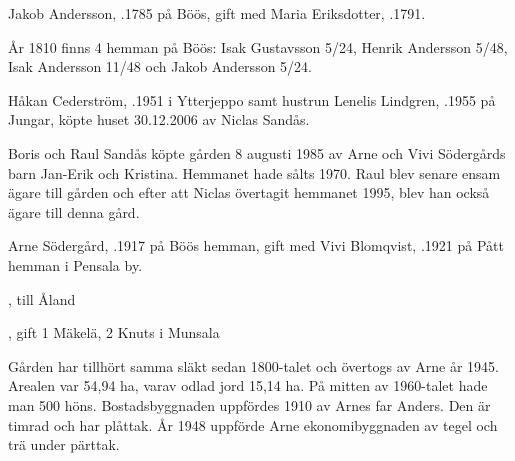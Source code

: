 Jakob Andersson,  .1785 på Böös, gift med Maria Eriksdotter, .1791.
\begin{jhchildren}
  \item {}
  \item {}
  \item {}
  \item {}
  \item {}
  \item {}
\end{jhchildren}
År 1810 finns 4 hemman på Böös: Isak Gustavsson 5/24, Henrik Andersson 5/48, Isak Andersson 11/48 och Jakob Andersson 5/24.




Håkan Cederström,  .1951 i Ytterjeppo samt hustrun Lenelis Lindgren, .1955 på Jungar, köpte huset 30.12.2006
av Niclas Sandås.

Boris och Raul Sandås köpte gården 8 augusti 1985 av Arne och Vivi Södergårds barn Jan-Erik och Kristina. Hemmanet hade sålts 1970. Raul blev senare ensam ägare till gården och efter att Niclas övertagit hemmanet 1995, blev han också ägare till denna gård.


Arne Södergård, .1917 på Böös hemman, gift med Vivi Blomqvist, .1921 på Pått hemman i Pensala by.
\begin{jhchildren}
  \item {}, till Åland
  \item {}, gift 1 Mäkelä, 2 Knuts i Munsala
  \item {}
\end{jhchildren}


Gården har tillhört samma släkt sedan 1800-talet och övertogs av Arne år 1945. Arealen var 54,94 ha, varav odlad jord 15,14 ha. På mitten av 1960-talet hade man 500 höns. Bostadsbyggnaden  uppfördes 1910 av Arnes far Anders. Den är timrad och har plåttak. År 1948 uppförde Arne ekonomibyggnaden av tegel och trä under pärttak.


